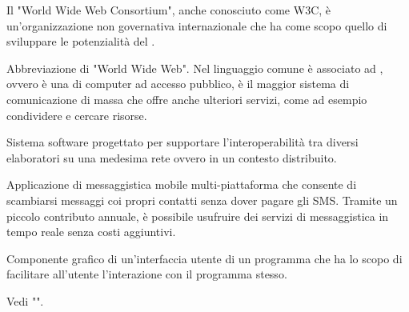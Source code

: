 

{Il "World Wide Web Consortium", anche conosciuto come W3C, è un'organizzazione non governativa internazionale che ha come scopo quello di sviluppare le potenzialità del .}

{Abbreviazione di "World Wide Web". Nel linguaggio comune è associato ad , ovvero è una  di computer ad accesso pubblico, è il maggior sistema di comunicazione di massa che offre anche ulteriori servizi, come ad esempio condividere e cercare risorse.}

{Sistema software progettato per supportare l'interoperabilità tra diversi elaboratori su una medesima rete ovvero in un contesto distribuito.}

{Applicazione di messaggistica mobile multi-piattaforma che consente di scambiarsi messaggi coi propri contatti senza dover pagare gli SMS. Tramite un piccolo contributo annuale, è possibile usufruire dei servizi di messaggistica in tempo reale senza costi aggiuntivi.}

{Componente grafico di un'interfaccia utente di un programma che ha lo scopo di facilitare all'utente l'interazione con il programma stesso.}

{Vedi "".}
